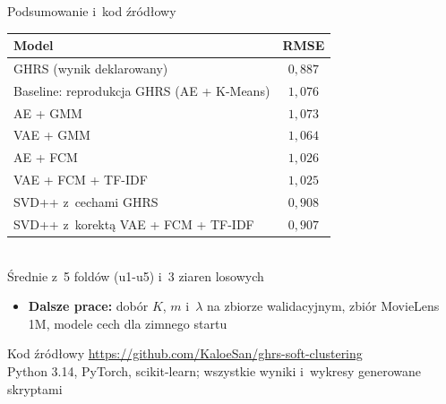 \documentclass[red]{beamer}
\begin{document}
    \begin{frame}{Podsumowanie i~kod źródłowy}
        \small
        \begin{center}
            \footnotesize
            \begin{tabular}{lc}
                \toprule
                \textbf{Model} & \textbf{RMSE} \\
                \midrule
                GHRS (wynik deklarowany) & $0{,}887$ \\
                Baseline: reprodukcja GHRS (AE + K-Means) & $1{,}076$ \\
                AE + GMM & $1{,}073$ \\
                VAE + GMM & $1{,}064$ \\
                AE + FCM & $1{,}026$ \\
                VAE + FCM + TF-IDF & $1{,}025$ \\
                SVD++ z~cechami GHRS & $0{,}908$ \\
                SVD++ z~korektą VAE + FCM + TF-IDF & $0{,}907$ \\
                \bottomrule
            \end{tabular}\\[2pt]
            {\scriptsize Średnie z~5 foldów (u1-u5) i~3 ziaren losowych}
        \end{center}
        \begin{itemize}
            \item \textbf{Dalsze prace:} dobór $K$, $m$ i~$\lambda$ na zbiorze walidacyjnym,
                  zbiór MovieLens 1M, modele cech dla zimnego startu
        \end{itemize}
        \begin{block}{Kod źródłowy}
            \url{https://github.com/KaloeSan/ghrs-soft-clustering}\\[2pt]
            {\scriptsize Python 3.14, PyTorch, scikit-learn; wszystkie wyniki i~wykresy
            generowane skryptami}
        \end{block}
    \end{frame}
\end{document}
